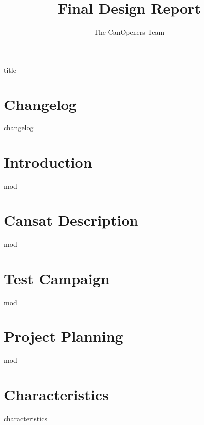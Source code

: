 \documentclass[a4paper, 13pt]{report}
\author{The CanOpeners Team}
\title{Final Design Report}
\date{}
\begin{document}
\begin{titlepage}
  {title}
\end{titlepage}
\tableofcontents


\chapter{Changelog}
{changelog}
\chapter{Introduction}
{mod}
\chapter{Cansat Description}
{mod}
\chapter{Test Campaign}
{mod}
\chapter{Project Planning}
{mod}
\chapter{Characteristics}
{characteristics}	
\end{document}
